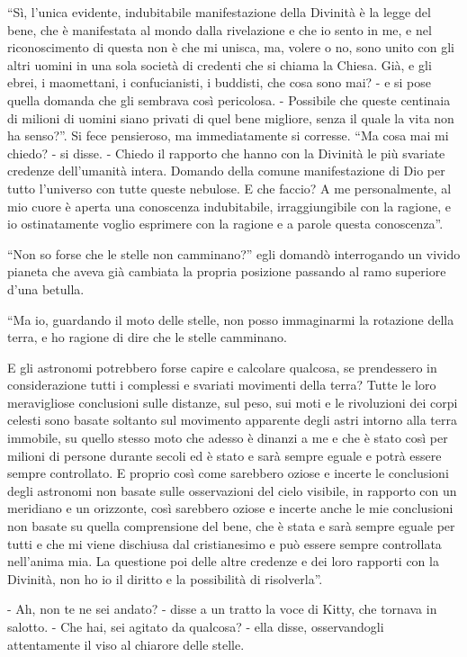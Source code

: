 ``Sì, l'unica evidente, indubitabile manifestazione della Divinità è la legge del bene, che è manifestata al mondo dalla rivelazione e che io sento in me, e nel riconoscimento di questa non è che mi unisca, ma, volere o no, sono unito con gli altri uomini in una sola società di credenti che si chiama la Chiesa. Già, e gli ebrei, i maomettani, i confucianisti, i buddisti, che cosa sono mai? - e si pose quella domanda che gli sembrava così pericolosa. - Possibile che queste centinaia di milioni di uomini siano privati di quel bene migliore, senza il quale la vita non ha senso?''. Si fece pensieroso, ma immediatamente si corresse. ``Ma cosa mai mi chiedo? - si disse. - Chiedo il rapporto che hanno con la Divinità le più svariate credenze dell'umanità intera. Domando della comune manifestazione di Dio per tutto l'universo con tutte queste nebulose. E che faccio? A me personalmente, al mio cuore è aperta una conoscenza indubitabile, irraggiungibile con la ragione, e io ostinatamente voglio esprimere con la ragione e a parole questa conoscenza''. 

``Non so forse che le stelle non camminano?'' egli domandò interrogando un vivido pianeta che aveva già cambiata la propria posizione passando al ramo superiore d'una betulla. 

``Ma io, guardando il moto delle stelle, non posso immaginarmi la rotazione della terra, e ho ragione di dire che le stelle camminano. 

E gli astronomi potrebbero forse capire e calcolare qualcosa, se prendessero in considerazione tutti i complessi e svariati movimenti della terra? Tutte le loro meravigliose conclusioni sulle distanze, sul peso, sui moti e le rivoluzioni dei corpi celesti sono basate soltanto sul movimento apparente degli astri intorno alla terra immobile, su quello stesso moto che adesso è dinanzi a me e che è stato così per milioni di persone durante secoli ed è stato e sarà sempre eguale e potrà essere sempre controllato. E proprio così come sarebbero oziose e incerte le conclusioni degli astronomi non basate sulle osservazioni del cielo visibile, in rapporto con un meridiano e un orizzonte, così sarebbero oziose e incerte anche le mie conclusioni non basate su quella comprensione del bene, che è stata e sarà sempre eguale per tutti e che mi viene dischiusa dal cristianesimo e può essere sempre controllata nell'anima mia. La questione poi delle altre credenze e dei loro rapporti con la Divinità, non ho io il diritto e la possibilità di risolverla''. 

- Ah, non te ne sei andato? - disse a un tratto la voce di Kitty, che tornava in salotto. - Che hai, sei agitato da qualcosa? - ella disse, osservandogli attentamente il viso al chiarore delle stelle. 

